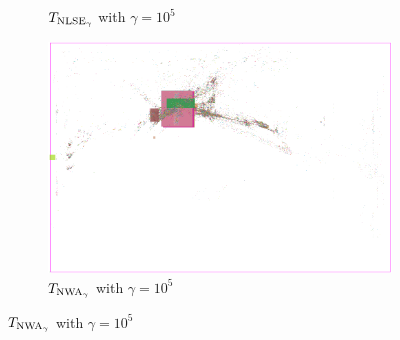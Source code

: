 \begin{figure}
\begin{subfigure}{.32\textwidth}
  \caption{\(T_{\operatorname{NLSE}_\gamma}\) with \(\gamma = 10^5\)}
 \end{subfigure}
 \hfill
 \begin{subfigure}{.32\textwidth}
  \includegraphics[width=\textwidth]{start_vectors/convergence_Chip1_WA_qp_100000_gamma.png}  
  \caption{\(T_{\operatorname{NWA}_\gamma}\) with \(\gamma = 10^5\)}
 \end{subfigure}

 \bigskip
 

\end{figure}
